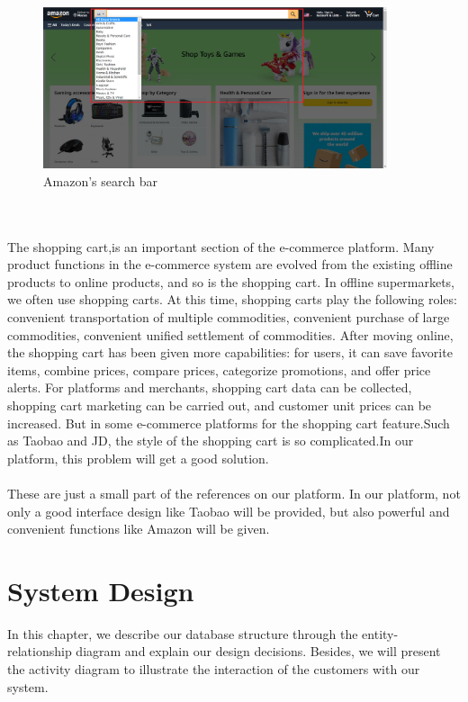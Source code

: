 \documentclass{article}
\begin{document}
\begin{figure}[!htp]
    \centering
    \includegraphics[width=0.9\textwidth]{Amazon search bar.png}
    \caption{\label{fig:card view}Amazon's search bar}
\end{figure} 
\\\\
The shopping cart,is an important section of the e-commerce platform. Many product functions in the e-commerce system are evolved from the existing offline products to online products, and so is the shopping cart. In offline supermarkets, we often use shopping carts. At this time, shopping carts play the following roles: convenient transportation of multiple commodities, convenient purchase of large commodities, convenient unified settlement of commodities. After moving online, the shopping cart has been given more capabilities: for users, it can save favorite items, combine prices, compare prices, categorize promotions, and offer price alerts. For platforms and merchants, shopping cart data can be collected, shopping cart marketing can be carried out, and customer unit prices can be increased\cite{shopc}. But in some e-commerce platforms for the shopping cart feature.Such as Taobao and JD, the style of the shopping cart is so complicated.In our platform, this problem will get a good solution.  
\\\\
These are just a small part of the references on our platform. In our platform,  not only a good interface design like Taobao will be provided, but also powerful and convenient functions like Amazon will be given.


\clearpage

\section{System Design}

In this chapter, we describe our database structure through the entity-relationship diagram and explain our design decisions. Besides, we will present the activity diagram to illustrate the interaction of the customers with our system.
\end{document}
